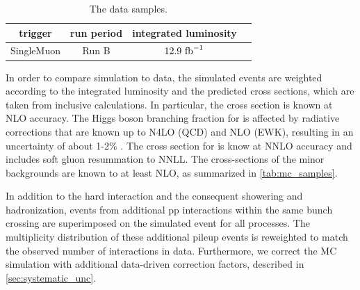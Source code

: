 \begin{table}[h!]
\begin{center}
\caption{The data samples.}
\label{tab:data_samples}
\begin{tabular}{cccc}
\hline
trigger & run period & integrated luminosity \\
\hline
SingleMuon & Run B & $12.9~\mathrm{fb}^{-1}$ \\
\hline
\hline
\end{tabular}
\end{center}
\end{table}

In order to compare simulation to data, the simulated events are weighted according to the integrated luminosity and the predicted cross sections, which are taken from inclusive calculations. In particular, the \ttH cross section is known at NLO accuracy\cite{Dittmaier:1318996,Beenakker:2001rj,Beenakker:2002nc,Dawson:2002tg,Dawson:2003zu}. The Higgs boson branching fraction for \Hbb is affected by radiative corrections that are known up to N4LO (QCD) and NLO (EWK), resulting in an uncertainty of about 1-2\% \cite{Djouadi:1997yw,Butterworth:2010ym,deFlorian:2016spz}.
The cross section for \ttbar is know at NNLO accuracy and includes soft gluon resummation to NNLL\cite{Czakon:2011xx}. The cross-sections of the minor backgrounds are known to at least NLO, as summarized in \cref{tab:mc_samples}.

In addition to the hard interaction and the consequent showering and hadronization, events from additional pp interactions within the same bunch crossing are superimposed on the simulated event for all processes. The multiplicity distribution of these additional pileup events is reweighted to match the observed number of interactions in data. Furthermore, we correct the MC simulation with additional data-driven correction factors, described in \cref{sec:systematic_unc}.

